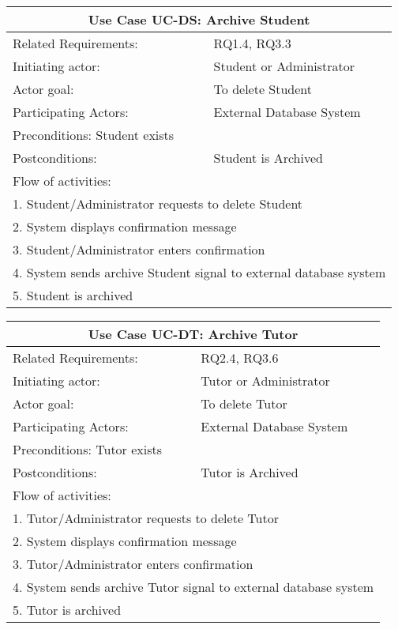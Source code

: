 \documentclass[12pt]{article}
\begin{document}
{		\begin{tabular}{| l | p{10cm}| }
			\hline\multicolumn{2}{|c|}{ \textbf{Use Case UC-DS: Archive Student}} \\ \hline
			Related Requirements: & RQ1.4, RQ3.3 \\ \hline
			Initiating actor: & Student or Administrator \\ \hline
			Actor goal: & To delete Student\\ \hline
			Participating Actors: & External Database System\\ \hline
			Preconditions: Student exists\\ \hline
			Postconditions: & Student is Archived\\ \hline
			\multicolumn{2}{|l|}{Flow of activities:}\\ \hline
			\multicolumn{2}{|p{15cm}|}{1. Student/Administrator requests to delete Student}\\
			\multicolumn{2}{|p{15cm}|}{2. System displays confirmation message}\\
			\multicolumn{2}{|p{15cm}|}{3. Student/Administrator enters confirmation}	\\		
			\multicolumn{2}{|p{15cm}|}{4. System sends archive Student signal to external database system}\\
			\multicolumn{2}{|l|}{5. Student is archived}	
			\\ \hline		
		\end{tabular}
		
		\begin{tabular}{| l | p{10cm}| }
			\hline\multicolumn{2}{|c|}{ \textbf{Use Case UC-DT: Archive Tutor}} \\ \hline
			Related Requirements: & RQ2.4, RQ3.6 \\ \hline
			Initiating actor: & Tutor or Administrator \\ \hline
			Actor goal: & To delete Tutor\\ \hline
			Participating Actors: & External Database System\\ \hline
			Preconditions: Tutor exists\\ \hline
			Postconditions: & Tutor is Archived\\ \hline
			\multicolumn{2}{|l|}{Flow of activities:}\\ \hline
			\multicolumn{2}{|p{15cm}|}{1. Tutor/Administrator requests to delete Tutor}\\
			\multicolumn{2}{|p{15cm}|}{2. System displays confirmation message}\\
			\multicolumn{2}{|p{15cm}|}{3. Tutor/Administrator enters confirmation}	\\		
			\multicolumn{2}{|p{15cm}|}{4. System sends archive Tutor signal to external database system}\\
			\multicolumn{2}{|l|}{5. Tutor is archived}	
			\\ \hline		
		\end{tabular}
		
}
\end{document}
